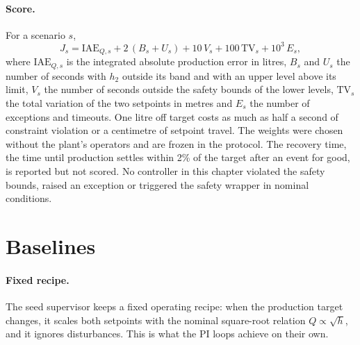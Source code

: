 \paragraph{Score.} For a scenario $s$,
\begin{equation}
  J_s = \mathrm{IAE}_{Q,s} + 2\,(B_s + U_s) + 10\,V_s + 100\,\mathrm{TV}_s
        + 10^3\,E_s ,
  \label{eq:coord-score}
\end{equation}
where $\mathrm{IAE}_{Q,s}$ is the integrated absolute production error in
litres, $B_s$ and $U_s$ the number of seconds with $h_2$ outside its band and
with an upper level above its limit, $V_s$ the number of seconds outside the
safety bounds of the lower levels, $\mathrm{TV}_s$ the total variation of the
two setpoints in metres and $E_s$ the number of exceptions and timeouts. One
litre off target costs as much as half a second of constraint violation or a
centimetre of setpoint travel. The weights were chosen without the plant's
operators and are frozen in the protocol. The recovery time, the time until
production settles within 2\% of the target after an event for good, is
reported but not scored. No controller in this chapter violated the safety
bounds, raised an exception or triggered the safety wrapper in nominal
conditions.

\section{Baselines}
\label{sec:coord-baselines}
\paragraph{Fixed recipe.} The seed supervisor keeps a fixed operating
recipe: when the production target changes, it scales both setpoints with
the nominal square-root relation $Q \propto \sqrt{h}$, and it ignores
disturbances. This is what the PI loops achieve on their own.


